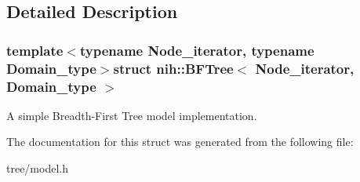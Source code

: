 \subsection{\-Detailed \-Description}
\subsubsection*{template$<$typename Node\-\_\-iterator, typename Domain\-\_\-type$>$struct nih\-::\-B\-F\-Tree$<$ Node\-\_\-iterator, Domain\-\_\-type $>$}

\-A simple \-Breadth-\/\-First \-Tree model implementation. 

\-The documentation for this struct was generated from the following file\-:\begin{DoxyCompactItemize}
\item 
tree/model.\-h\end{DoxyCompactItemize}
